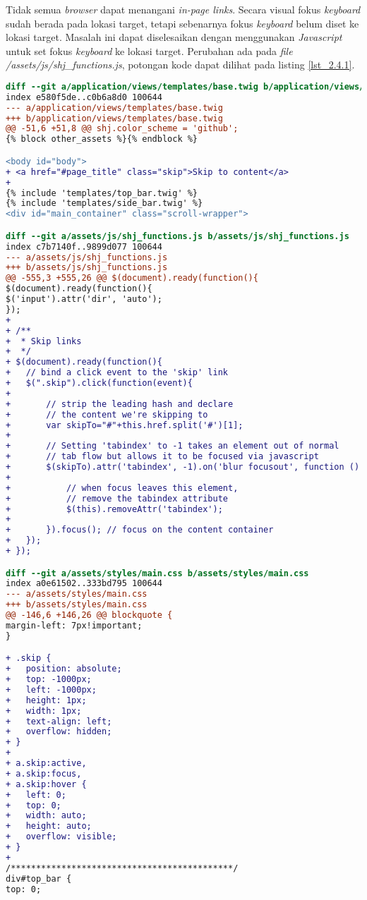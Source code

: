 Tidak semua \textit{browser} dapat menangani \textit{in-page links}. Secara visual fokus \textit{keyboard} sudah berada pada lokasi target, tetapi sebenarnya fokus \textit{keyboard} belum diset ke lokasi target. Masalah ini dapat diselesaikan dengan menggunakan \textit{Javascript} untuk set fokus \textit{keyboard} ke lokasi target. Perubahan ada pada \textit{file} \textit{/assets/js/shj\_functions.js}, potongan kode dapat dilihat pada listing \ref{lst_2.4.1}.

\begin{lstlisting}[language=diff, caption=Perubahan untuk mematuhi kriteria 2.4.1, label=lst_2.4.1, basicstyle=\ttfamily, frame=single,
columns=fullflexible, keepspaces=true, breaklines=true]
diff --git a/application/views/templates/base.twig b/application/views/templates/base.twig
index e580f5de..c0b6a8d0 100644
--- a/application/views/templates/base.twig
+++ b/application/views/templates/base.twig
@@ -51,6 +51,8 @@ shj.color_scheme = 'github';
{% block other_assets %}{% endblock %}

<body id="body">
+ <a href="#page_title" class="skip">Skip to content</a>
+ 
{% include 'templates/top_bar.twig' %}
{% include 'templates/side_bar.twig' %}
<div id="main_container" class="scroll-wrapper">

diff --git a/assets/js/shj_functions.js b/assets/js/shj_functions.js
index c7b7140f..9899d077 100644
--- a/assets/js/shj_functions.js
+++ b/assets/js/shj_functions.js
@@ -555,3 +555,26 @@ $(document).ready(function(){
$(document).ready(function(){
$('input').attr('dir', 'auto');
});
+ 
+ /**
+  * Skip links
+  */
+ $(document).ready(function(){
+ 	// bind a click event to the 'skip' link
+ 	$(".skip").click(function(event){
+     
+ 		// strip the leading hash and declare
+ 		// the content we're skipping to
+ 		var skipTo="#"+this.href.split('#')[1];
+ 
+ 		// Setting 'tabindex' to -1 takes an element out of normal 
+ 		// tab flow but allows it to be focused via javascript
+ 		$(skipTo).attr('tabindex', -1).on('blur focusout', function () {
+ 
+ 			// when focus leaves this element, 
+ 			// remove the tabindex attribute
+ 			$(this).removeAttr('tabindex');
+ 
+ 		}).focus(); // focus on the content container
+ 	});
+ });

diff --git a/assets/styles/main.css b/assets/styles/main.css
index a0e61502..333bd795 100644
--- a/assets/styles/main.css
+++ b/assets/styles/main.css
@@ -146,6 +146,26 @@ blockquote {
margin-left: 7px!important;
}

+ .skip {
+ 	position: absolute;
+ 	top: -1000px;
+ 	left: -1000px;
+  	height: 1px;
+ 	width: 1px;
+ 	text-align: left;
+ 	overflow: hidden;
+ }
+ 
+ a.skip:active, 
+ a.skip:focus, 
+ a.skip:hover {
+ 	left: 0; 
+ 	top: 0;
+ 	width: auto; 
+ 	height: auto; 
+ 	overflow: visible; 
+ }
+ 
/********************************************/
div#top_bar {
top: 0;
\end{lstlisting}


